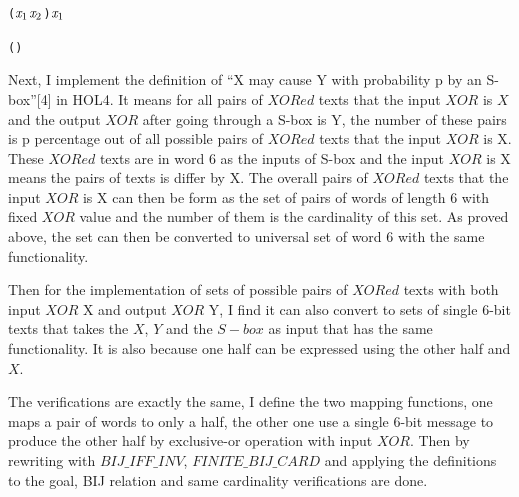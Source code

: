 \documentclass{article}
\begin{document}
\begin{alltt}
  \HOLTokenTurnstile{}  (\ensuremath{\HOLFreeVar{x}\sb{\mathrm{1}}}\HOLSymConst{,}\ensuremath{\HOLFreeVar{x}\sb{\mathrm{2}}}) \HOLSymConst{=} \ensuremath{\HOLFreeVar{x}\sb{\mathrm{1}}}
\end{alltt}

\begin{alltt}
  \HOLTokenTurnstile{}   \HOLSymConst{=} (\HOLSymConst{,})
\end{alltt}

Next, I implement the definition of ``X may cause Y with probability p by an S-box''[4] in HOL4. It means for all
pairs of $XORed$ texts that the input $XOR$ is $X$ and the output $XOR$ after going through a S-box is Y, the number
of these pairs is p percentage out of all possible pairs of $XORed$ texts that the input $XOR$ is X.
These $XORed$ texts are in word 6 as the inputs of S-box and the input $XOR$ is X means the pairs of
texts is differ by X. The overall pairs of $XORed$ texts that the input $XOR$ is X can then be form as the set of pairs
of words of length 6 with fixed $XOR$ value and the number of them is the cardinality of this set. As proved above,
the set can then be converted to universal set of word 6 with the same functionality.

Then for the implementation of sets of possible pairs of $XORed$ texts with both input $XOR$ X and output $XOR$ Y,
I find it can also convert to sets of single 6-bit texts that takes the $X$, $Y$ and the $S-box$ as input that has the
same functionality. It is also because one half can be expressed using the other half and $X$.

\begin{alltt}
  
\end{alltt}

\begin{alltt}
  
\end{alltt}

The verifications are exactly the same, I define the two mapping functions, one maps a pair of words to only a half, the
other one use a single 6-bit message to produce the other half by exclusive-or operation with input $XOR$. Then by rewriting
with $BIJ\_IFF\_INV$, $FINITE\_BIJ\_CARD$ and applying the definitions to the goal, BIJ relation and same cardinality
verifications are done.

\begin{alltt}
  
\end{alltt}
\end{document}
